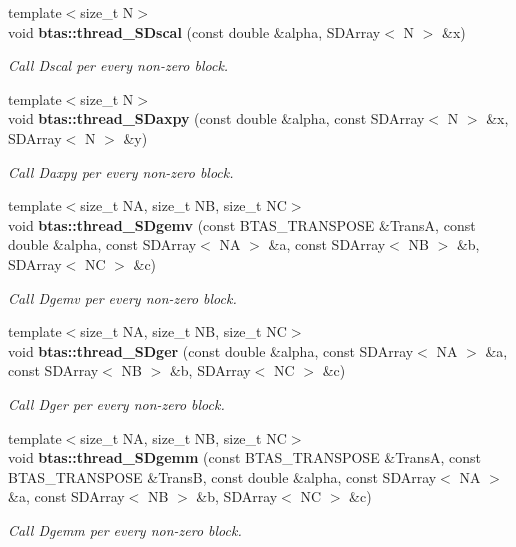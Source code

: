 \begin{DoxyCompactItemize}
{\footnotesize template$<$size\-\_\-t N$>$ }\\void {\bf btas\-::thread\-\_\-\-S\-Dscal} (const double \&alpha, S\-D\-Array$<$ N $>$ \&x)
\begin{DoxyCompactList}\small\item\em Call Dscal per every non-\/zero block. \end{DoxyCompactList}\item 
{\footnotesize template$<$size\-\_\-t N$>$ }\\void {\bf btas\-::thread\-\_\-\-S\-Daxpy} (const double \&alpha, const S\-D\-Array$<$ N $>$ \&x, S\-D\-Array$<$ N $>$ \&y)
\begin{DoxyCompactList}\small\item\em Call Daxpy per every non-\/zero block. \end{DoxyCompactList}\item 
{\footnotesize template$<$size\-\_\-t N\-A, size\-\_\-t N\-B, size\-\_\-t N\-C$>$ }\\void {\bf btas\-::thread\-\_\-\-S\-Dgemv} (const B\-T\-A\-S\-\_\-\-T\-R\-A\-N\-S\-P\-O\-S\-E \&Trans\-A, const double \&alpha, const S\-D\-Array$<$ N\-A $>$ \&a, const S\-D\-Array$<$ N\-B $>$ \&b, S\-D\-Array$<$ N\-C $>$ \&c)
\begin{DoxyCompactList}\small\item\em Call Dgemv per every non-\/zero block. \end{DoxyCompactList}\item 
{\footnotesize template$<$size\-\_\-t N\-A, size\-\_\-t N\-B, size\-\_\-t N\-C$>$ }\\void {\bf btas\-::thread\-\_\-\-S\-Dger} (const double \&alpha, const S\-D\-Array$<$ N\-A $>$ \&a, const S\-D\-Array$<$ N\-B $>$ \&b, S\-D\-Array$<$ N\-C $>$ \&c)
\begin{DoxyCompactList}\small\item\em Call Dger per every non-\/zero block. \end{DoxyCompactList}\item 
{\footnotesize template$<$size\-\_\-t N\-A, size\-\_\-t N\-B, size\-\_\-t N\-C$>$ }\\void {\bf btas\-::thread\-\_\-\-S\-Dgemm} (const B\-T\-A\-S\-\_\-\-T\-R\-A\-N\-S\-P\-O\-S\-E \&Trans\-A, const B\-T\-A\-S\-\_\-\-T\-R\-A\-N\-S\-P\-O\-S\-E \&Trans\-B, const double \&alpha, const S\-D\-Array$<$ N\-A $>$ \&a, const S\-D\-Array$<$ N\-B $>$ \&b, S\-D\-Array$<$ N\-C $>$ \&c)
\begin{DoxyCompactList}\small\item\em Call Dgemm per every non-\/zero block. \end{DoxyCompactList}\item 

\end{DoxyCompactItemize}
